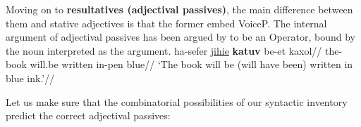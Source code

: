 Moving on to \textbf{resultatives (adjectival passives)}, the main difference between them and stative adjectives is that the former embed VoiceP. The internal argument of adjectival passives has been argued by \citet[386]{bruening14nllt} to be an Operator, bound by the noun interpreted as the argument.
\pex\label{ex:heb-ana}
    \a \begingl
        \gla ha-sefer \underline{jihie} \textbf{katuv} be-et kaxol//
        \glb the-book will.be written in-pen blue//
        \glft `The book will be (will have been) written in blue ink.'//
    \endgl
    \a 
\xe

Let us make sure that the combinatorial possibilities of our syntactic inventory predict the correct adjectival passives:

